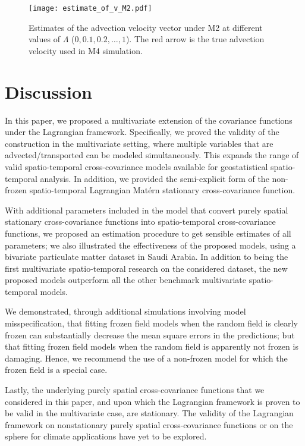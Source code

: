 \documentclass[12pt]{article}
\newcommand{\0}{\mathbf{0}}
\begin{document}
\begin{figure}[b!]
 \centering
 \texttt{[image: estimate\_of\_v\_M2.pdf]}
  \caption{\small Estimates of the advection velocity vector under M2 at different values of $\Lambda$ ($0, 0.1,0.2,\ldots,1$). The red arrow is the true advection velocity used in M4 simulation.}
    \label{fig:m2est}
\end{figure}


\section{Discussion} \label{sec:discussion}

In this paper, we proposed a multivariate extension of the covariance functions under the Lagrangian framework. Specifically, we proved the validity of the construction in the multivariate setting, where multiple variables that are advected/transported can be modeled simultaneously. This expands the range of valid spatio-temporal cross-covariance models available for geostatistical spatio-temporal analysis. In addition, we provided the semi-explicit form of the non-frozen spatio-temporal Lagrangian Mat\'{e}rn stationary cross-covariance function.

With additional parameters included in the model that convert purely spatial stationary cross-covariance functions into spatio-temporal cross-covariance functions, we proposed an estimation procedure to get sensible estimates of all parameters; we also illustrated the effectiveness of the proposed models, using a bivariate particulate matter dataset in Saudi Arabia. In addition to being the first multivariate spatio-temporal research on the considered dataset, the new proposed models outperform all the other benchmark multivariate spatio-temporal models. 

We demonstrated, through additional simulations involving model misspecification, that fitting frozen field models when the random field is clearly frozen can substantially decrease the mean square errors in the predictions; but that fitting frozen field models when the random field is apparently not frozen is damaging. Hence, we recommend the use of a non-frozen model for which the frozen field is a special case.

Lastly, the underlying purely spatial cross-covariance functions that we considered in this paper, and upon which the Lagrangian framework is proven to be valid in the multivariate case, are stationary. The validity of the Lagrangian framework on nonstationary purely spatial cross-covariance functions \citep[e.g.,][]{2012KN} or on the sphere for climate applications \citep[e.g.,][]{2013CS} have yet to be explored.
\end{document}
